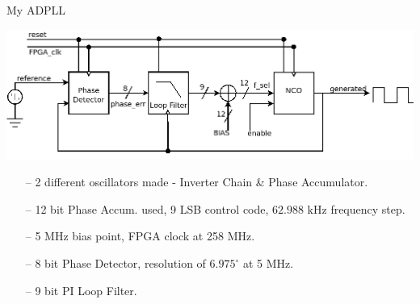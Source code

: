 \documentclass{beamer}
\begin{document}
\begin{frame}{My ADPLL}
 	\begin{center}
 		\includegraphics[scale=0.25]{../rtl}
 	\end{center}
		
	\begin{itemize}
		\item[--]
			2 different oscillators made - Inverter Chain \& Phase Accumulator.
		\item[--]
            12 bit Phase Accum. used, 9 LSB control code, $62.988\textrm{ kHz}$  frequency step.
		\item[--]
			5 MHz bias point, FPGA clock at 258 MHz.		
		\item[--]
			8 bit Phase Detector, resolution of $6.975^\circ$ at 5 MHz.
		\item[--]
			9 bit PI Loop Filter. %
	\end{itemize}
\end{frame}
\end{document}

